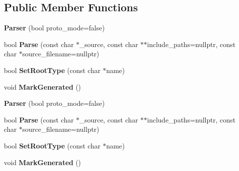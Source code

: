 \subsection*{Public Member Functions}
\begin{DoxyCompactItemize}
\item 
\mbox{\label{classflatbuffers_1_1Parser_a4d3ab0c4978d63048425316d52c24604}} 
{\bfseries Parser} (bool proto\+\_\+mode=false)
\item 
\mbox{\label{classflatbuffers_1_1Parser_a4068f1bd69aafc31c663e2b3dbf3e372}} 
bool {\bfseries Parse} (const char $\ast$\+\_\+source, const char $\ast$$\ast$include\+\_\+paths=nullptr, const char $\ast$source\+\_\+filename=nullptr)
\item 
\mbox{\label{classflatbuffers_1_1Parser_a449aa665b6fa14746f6849523f2a7b88}} 
bool {\bfseries Set\+Root\+Type} (const char $\ast$name)
\item 
\mbox{\label{classflatbuffers_1_1Parser_a0646d880e088428112e2122582d33da4}} 
void {\bfseries Mark\+Generated} ()
\item 
\mbox{\label{classflatbuffers_1_1Parser_a4d3ab0c4978d63048425316d52c24604}} 
{\bfseries Parser} (bool proto\+\_\+mode=false)
\item 
\mbox{\label{classflatbuffers_1_1Parser_a4068f1bd69aafc31c663e2b3dbf3e372}} 
bool {\bfseries Parse} (const char $\ast$\+\_\+source, const char $\ast$$\ast$include\+\_\+paths=nullptr, const char $\ast$source\+\_\+filename=nullptr)
\item 
\mbox{\label{classflatbuffers_1_1Parser_a449aa665b6fa14746f6849523f2a7b88}} 
bool {\bfseries Set\+Root\+Type} (const char $\ast$name)
\item 
\mbox{\label{classflatbuffers_1_1Parser_a0646d880e088428112e2122582d33da4}} 
void {\bfseries Mark\+Generated} ()
\end{DoxyCompactItemize}
